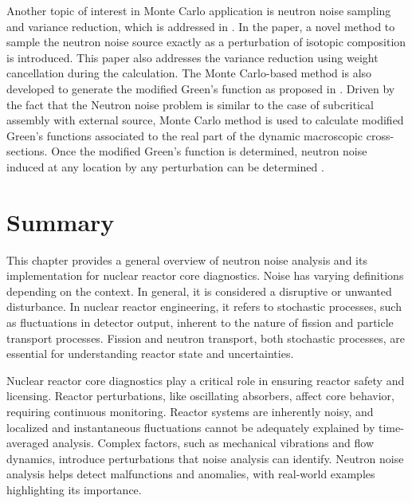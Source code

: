 Another topic of interest in Monte Carlo application is neutron noise sampling and variance reduction, which is addressed in \cite{belangerVarianceReductionNoise2022}. In the paper, a novel method to sample the neutron noise source exactly as a perturbation of isotopic composition is introduced. This paper also addresses the variance reduction using weight cancellation during the calculation. The Monte Carlo-based method is also developed to generate the modified Green’s function as proposed in \cite{demaziereMonteCarlobasedDynamic29}. Driven by the fact that the Neutron noise problem is similar to the case of subcritical assembly with external source, Monte Carlo method is used to calculate modified Green’s functions associated to the real part of the dynamic macroscopic cross-sections. Once the modified Green’s function is determined, neutron noise induced at any location by any perturbation can be determined \cite{demaziereMonteCarlobasedDynamic29}.

\section{Summary}

This chapter provides a general overview of neutron noise analysis and its implementation for nuclear reactor core diagnostics. Noise has varying definitions depending on the context. In general, it is considered a disruptive or unwanted disturbance. In nuclear reactor engineering, it refers to stochastic processes, such as fluctuations in detector output, inherent to the nature of fission and particle transport processes. Fission and neutron transport, both stochastic processes, are essential for understanding reactor state and uncertainties. 

Nuclear reactor core diagnostics play a critical role in ensuring reactor safety and licensing. Reactor perturbations, like oscillating absorbers, affect core behavior, requiring continuous monitoring. Reactor systems are inherently noisy, and localized and instantaneous fluctuations cannot be adequately explained by time-averaged analysis. Complex factors, such as mechanical vibrations and flow dynamics, introduce perturbations that noise analysis can identify. Neutron noise analysis helps detect malfunctions and anomalies, with real-world examples highlighting its importance. 

